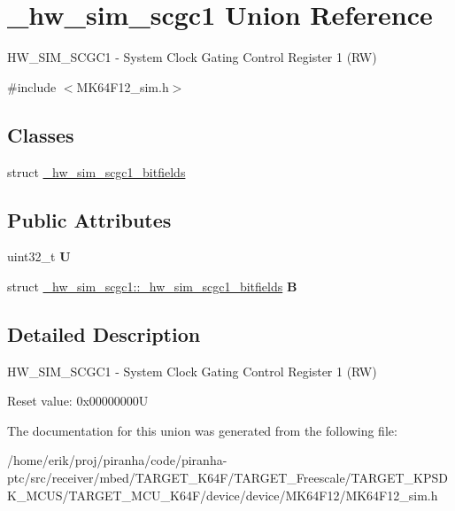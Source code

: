 \hypertarget{union__hw__sim__scgc1}{}\section{\+\_\+hw\+\_\+sim\+\_\+scgc1 Union Reference}
\label{union__hw__sim__scgc1}


H\+W\+\_\+\+S\+I\+M\+\_\+\+S\+C\+G\+C1 -\/ System Clock Gating Control Register 1 (RW)  




{\ttfamily \#include $<$M\+K64\+F12\+\_\+sim.\+h$>$}

\subsection*{Classes}
\begin{DoxyCompactItemize}
\item 
struct \hyperlink{struct__hw__sim__scgc1_1_1__hw__sim__scgc1__bitfields}{\+\_\+hw\+\_\+sim\+\_\+scgc1\+\_\+bitfields}
\end{DoxyCompactItemize}
\subsection*{Public Attributes}
\begin{DoxyCompactItemize}
\item 
uint32\+\_\+t {\bfseries U}\hypertarget{union__hw__sim__scgc1_a70e1e96b22ae55017d178991ceb7dacc}{}\label{union__hw__sim__scgc1_a70e1e96b22ae55017d178991ceb7dacc}

\item 
struct \hyperlink{struct__hw__sim__scgc1_1_1__hw__sim__scgc1__bitfields}{\+\_\+hw\+\_\+sim\+\_\+scgc1\+::\+\_\+hw\+\_\+sim\+\_\+scgc1\+\_\+bitfields} {\bfseries B}\hypertarget{union__hw__sim__scgc1_a86c87cf4e56ae2d357498e007dafa2e9}{}\label{union__hw__sim__scgc1_a86c87cf4e56ae2d357498e007dafa2e9}

\end{DoxyCompactItemize}


\subsection{Detailed Description}
H\+W\+\_\+\+S\+I\+M\+\_\+\+S\+C\+G\+C1 -\/ System Clock Gating Control Register 1 (RW) 

Reset value\+: 0x00000000U 

The documentation for this union was generated from the following file\+:\begin{DoxyCompactItemize}
\item 
/home/erik/proj/piranha/code/piranha-\/ptc/src/receiver/mbed/\+T\+A\+R\+G\+E\+T\+\_\+\+K64\+F/\+T\+A\+R\+G\+E\+T\+\_\+\+Freescale/\+T\+A\+R\+G\+E\+T\+\_\+\+K\+P\+S\+D\+K\+\_\+\+M\+C\+U\+S/\+T\+A\+R\+G\+E\+T\+\_\+\+M\+C\+U\+\_\+\+K64\+F/device/device/\+M\+K64\+F12/M\+K64\+F12\+\_\+sim.\+h\end{DoxyCompactItemize}
